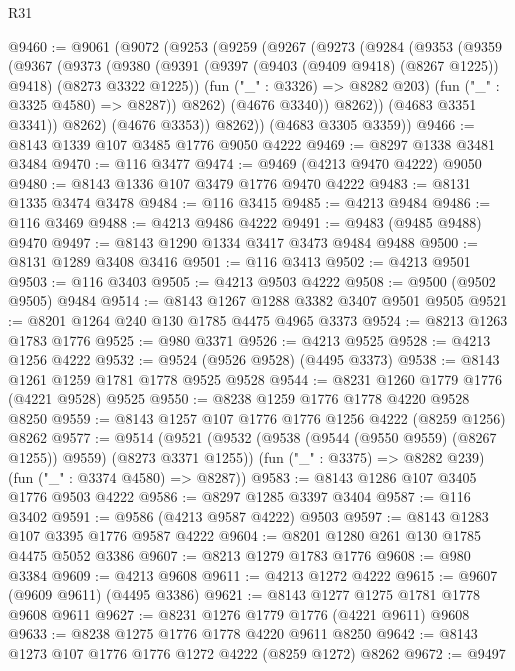 \begin{lexlean}{R31}
\begin{coremodule}
@9460 := @9061
    (@9072
      (@9253
        (@9259
          (@9267
            (@9273
              (@9284
                (@9353
                  (@9359
                    (@9367
                      (@9373
                        (@9380
                          (@9391
                            (@9397 (@9403 (@9409 @9418) (@8267 @1225)) @9418)
                            (@8273 @3322 @1225))
                          (fun ("_" : @3326) => @8282 @203)
                          (fun ("_" : @3325 @4580) => @8287))
                        @8262)
                      (@4676 @3340))
                    @8262))
                (@4683 @3351 @3341))
              @8262)
            (@4676 @3353))
          @8262))
      (@4683 @3305 @3359))
@9466 := @8143 @1339 @107 @3485 @1776 @9050 @4222
@9469 := @8297 @1338 @3481 @3484
@9470 := @116 @3477
@9474 := @9469 (@4213 @9470 @4222) @9050
@9480 := @8143 @1336 @107 @3479 @1776 @9470 @4222
@9483 := @8131 @1335 @3474 @3478
@9484 := @116 @3415
@9485 := @4213 @9484
@9486 := @116 @3469
@9488 := @4213 @9486 @4222
@9491 := @9483 (@9485 @9488) @9470
@9497 := @8143 @1290 @1334 @3417 @3473 @9484 @9488
@9500 := @8131 @1289 @3408 @3416
@9501 := @116 @3413
@9502 := @4213 @9501
@9503 := @116 @3403
@9505 := @4213 @9503 @4222
@9508 := @9500 (@9502 @9505) @9484
@9514 := @8143 @1267 @1288 @3382 @3407 @9501 @9505
@9521 := @8201 @1264 @240 @130 @1785 @4475 @4965 @3373
@9524 := @8213 @1263 @1783 @1776
@9525 := @980 @3371
@9526 := @4213 @9525
@9528 := @4213 @1256 @4222
@9532 := @9524 (@9526 @9528) (@4495 @3373)
@9538 := @8143 @1261 @1259 @1781 @1778 @9525 @9528
@9544 := @8231 @1260 @1779 @1776 (@4221 @9528) @9525
@9550 := @8238 @1259 @1776 @1778 @4220 @9528 @8250
@9559 := @8143 @1257 @107 @1776 @1776 @1256 @4222 (@8259 @1256) @8262
@9577 := @9514
    (@9521
      (@9532 (@9538 (@9544 (@9550 @9559) (@8267 @1255)) @9559) (@8273 @3371 @1255))
      (fun ("_" : @3375) => @8282 @239)
      (fun ("_" : @3374 @4580) => @8287))
@9583 := @8143 @1286 @107 @3405 @1776 @9503 @4222
@9586 := @8297 @1285 @3397 @3404
@9587 := @116 @3402
@9591 := @9586 (@4213 @9587 @4222) @9503
@9597 := @8143 @1283 @107 @3395 @1776 @9587 @4222
@9604 := @8201 @1280 @261 @130 @1785 @4475 @5052 @3386
@9607 := @8213 @1279 @1783 @1776
@9608 := @980 @3384
@9609 := @4213 @9608
@9611 := @4213 @1272 @4222
@9615 := @9607 (@9609 @9611) (@4495 @3386)
@9621 := @8143 @1277 @1275 @1781 @1778 @9608 @9611
@9627 := @8231 @1276 @1779 @1776 (@4221 @9611) @9608
@9633 := @8238 @1275 @1776 @1778 @4220 @9611 @8250
@9642 := @8143 @1273 @107 @1776 @1776 @1272 @4222 (@8259 @1272) @8262
@9672 := @9497

\end{coremodule}
\end{lexlean}
